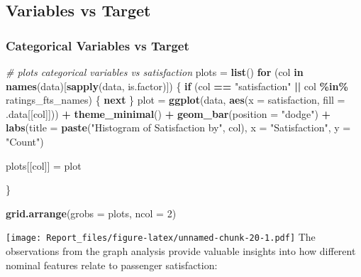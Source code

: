 \documentclass[
]{article}
\newenvironment{Shaded}{\begin{snugshade}}{\end{snugshade}}
\newcommand{\AttributeTok}[1]{\textcolor[rgb]{0.13,0.29,0.53}{#1}}
\newcommand{\CommentTok}[1]{\textcolor[rgb]{0.56,0.35,0.01}{\textit{#1}}}
\newcommand{\ControlFlowTok}[1]{\textcolor[rgb]{0.13,0.29,0.53}{\textbf{#1}}}
\newcommand{\DecValTok}[1]{\textcolor[rgb]{0.00,0.00,0.81}{#1}}
\newcommand{\FunctionTok}[1]{\textcolor[rgb]{0.13,0.29,0.53}{\textbf{#1}}}
\newcommand{\NormalTok}[1]{#1}
\newcommand{\OtherTok}[1]{\textcolor[rgb]{0.56,0.35,0.01}{#1}}
\newcommand{\SpecialCharTok}[1]{\textcolor[rgb]{0.81,0.36,0.00}{\textbf{#1}}}
\newcommand{\StringTok}[1]{\textcolor[rgb]{0.31,0.60,0.02}{#1}}
\begin{document}
\hypertarget{variables-vs-target}{%
\subsection{Variables vs Target}\label{variables-vs-target}}

\hypertarget{categorical-variables-vs-target}{%
\subsubsection{Categorical Variables vs
Target}\label{categorical-variables-vs-target}}

\begin{Shaded}
\begin{Highlighting}[]
\CommentTok{\# plots categorical variables vs satisfaction}
\NormalTok{plots }\OtherTok{=} \FunctionTok{list}\NormalTok{()}
\ControlFlowTok{for}\NormalTok{ (col }\ControlFlowTok{in} \FunctionTok{names}\NormalTok{(data)[}\FunctionTok{sapply}\NormalTok{(data, is.factor)]) \{}
  \ControlFlowTok{if}\NormalTok{ (col }\SpecialCharTok{==} \StringTok{"satisfaction"} \SpecialCharTok{||}\NormalTok{ col }\SpecialCharTok{\%in\%}\NormalTok{ ratings\_fts\_names) \{}
    \ControlFlowTok{next}
\NormalTok{  \}}
\NormalTok{  plot }\OtherTok{=} \FunctionTok{ggplot}\NormalTok{(data, }\FunctionTok{aes}\NormalTok{(}\AttributeTok{x =}\NormalTok{ satisfaction, }\AttributeTok{fill =}\NormalTok{ .data[[col]])) }\SpecialCharTok{+}
  \FunctionTok{theme\_minimal}\NormalTok{() }\SpecialCharTok{+}
  \FunctionTok{geom\_bar}\NormalTok{(}\AttributeTok{position =} \StringTok{"dodge"}\NormalTok{) }\SpecialCharTok{+}
  \FunctionTok{labs}\NormalTok{(}\AttributeTok{title =} \FunctionTok{paste}\NormalTok{(}\StringTok{"Histogram of Satisfaction by"}\NormalTok{, col), }\AttributeTok{x =} \StringTok{"Satisfaction"}\NormalTok{, }\AttributeTok{y =} \StringTok{"Count"}\NormalTok{)}

\NormalTok{  plots[[col]] }\OtherTok{=}\NormalTok{ plot}
  
\NormalTok{\}}

\FunctionTok{grid.arrange}\NormalTok{(}\AttributeTok{grobs =}\NormalTok{ plots, }\AttributeTok{ncol =} \DecValTok{2}\NormalTok{)}
\end{Highlighting}
\end{Shaded}

\texttt{[image: Report\_files/figure-latex/unnamed-chunk-20-1.pdf]} The
observations from the graph analysis provide valuable insights into how
different nominal features relate to passenger satisfaction:
\end{document}
